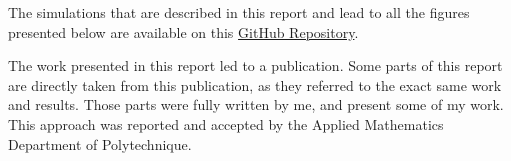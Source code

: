 The simulations that are described in this report and lead to all the figures presented below are available on this  \href{https://github.com/gregoirebechade/covid_internship}{GitHub Repository}\label{github-link}.

The work presented in this report led to a publication. 
Some parts of this report are directly taken from this publication, as they referred to the exact same work and results. 
Those parts were fully written by me, and present some of my work. 
This approach was reported and accepted by the Applied Mathematics Department of Polytechnique.  